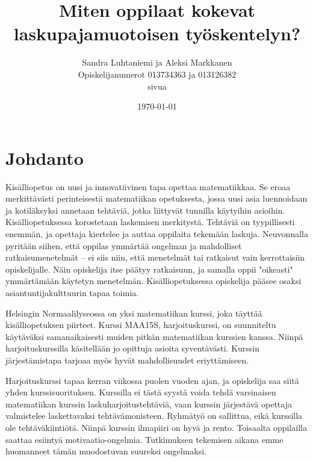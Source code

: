 \documentclass[a4paper,12pt,leqno,titlepage]{article}
\begin{document}
\begin{titlepage}
\title{Miten oppilaat kokevat laskupajamuotoisen työskentelyn?} %
\author{Sandra Luhtaniemi ja Aleksi Markkanen\\
Opiskelijanumerot 013734363 ja 013126382\\
\pageref{LastPage} sivua}
\date{\today}
\end{titlepage}
\maketitle
\pagebreak
\tableofcontents
\pagebreak

\section{Johdanto} %
Kisälliopetus on uusi ja innovatiivinen tapa opettaa matematiikkaa.
Se eroaa merkittävästi perinteisestä matematiikan opetuksesta, jossa uusi asia luennoidaan ja kotiläksyksi annetaan tehtäviä, jotka liittyvät tunnilla käytyihin asioihin.
Kisälliopetuksessa korostetaan laskemisen merkitystä.
Tehtäviä on tyypillisesti enemmän, ja opettaja kiertelee ja auttaa oppilaita tekemään laskuja.
Neuvonnalla pyritään siihen, että oppilas ymmärtää ongelman ja mahdolliset ratkaisumenetelmät -- ei siis niin, että menetelmät tai ratkaisut vain kerrottaisiin opiskelijalle.
Näin opiskelija itse päätyy ratkaisuun, ja samalla oppii "oikeasti" ymmärtämään käytetyn menetelmän.
Kisälli\-opetuksessa opiskelija pääsee osaksi asiantuntijakulttuurin tapaa toimia.\cite{hautala2012extreme,vihavainen2011extreme}

Helsingin Normaalilyseossa on yksi matematiikan kurssi, joka täyttää kisälliopetuksen piirteet.
Kurssi MAA15S, harjoituskurssi, on suunniteltu käytäväksi samanaikaisesti muiden pitkän matematiikan kurssien kanssa.
Niinpä harjoituskurssilla käsitellään jo opittuja asioita syventävästi.
Kurssin järjestämistapa tarjoaa myös hyvät mahdollisuudet eriyttämiseen.

Harjoituskurssi tapaa kerran viikossa puolen vuoden ajan, ja opiskelija saa siitä yhden kurssisuorituksen.
Kurssilla ei tästä syystä voida tehdä varsinaisen matematiikan kurssin laskuharjoitustehtäviä, vaan kurssin järjestävä opettaja valmistelee laskettavaksi tehtävämonisteen.
Ryhmätyö on sallittua, eikä kurssilla ole tehtäväkiintiötä.
Niinpä kurssin ilmapiiri on hyvä ja rento.
Toisaalta oppilailla saattaa esiintyä motivaatio-ongelmia.
Tutkimuksen tekemisen aikana emme huomanneet tämän muodostuvan suureksi ongelmaksi.
\end{document}
